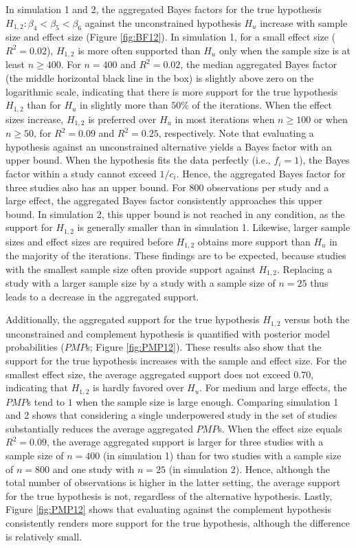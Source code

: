 \documentclass[review, 3p, authoryear]{elsarticle} %
\begin{document}
In simulation 1 and 2, the aggregated Bayes factors for the true hypothesis \(H_{1,2}: \beta_4 < \beta_5 < \beta_6\) against the unconstrained hypothesis \(H_u\) increase with sample size and effect size (Figure \ref{fig:BF12}).
In simulation 1, for a small effect size (\(R^2 = 0.02\)), \(H_{1,2}\) is more often supported than \(H_u\) only when the sample size is at least \(n \geq 400\).
For \(n = 400\) and \(R^2 = 0.02\), the median aggregated Bayes factor (the middle horizontal black line in the box) is slightly above zero on the logarithmic scale, indicating that there is more support for the true hypothesis \(H_{1,2}\) than for \(H_u\) in slightly more than \(50\%\) of the iterations.
When the effect sizes increase, \(H_{1,2}\) is preferred over \(H_u\) in most iterations when \(n \geq 100\) or when \(n \geq 50\), for \(R^2 = 0.09\) and \(R^2 = 0.25\), respectively.
Note that evaluating a hypothesis against an unconstrained alternative yields a Bayes factor with an upper bound.
When the hypothesis fits the data perfectly (i.e., \(f_i = 1\)), the Bayes factor within a study cannot exceed \(1/c_i\).
Hence, the aggregated Bayes factor for three studies also has an upper bound.
For \(800\) observations per study and a large effect, the aggregated Bayes factor consistently approaches this upper bound.
In simulation 2, this upper bound is not reached in any condition, as the support for \(H_{1,2}\) is generally smaller than in simulation 1.
Likewise, larger sample sizes and effect sizes are required before \(H_{1,2}\) obtains more support than \(H_u\) in the majority of the iterations.
These findings are to be expected, because studies with the smallest sample size often provide support against \(H_{1,2}\).
Replacing a study with a larger sample size by a study with a sample size of \(n = 25\) thus leads to a decrease in the aggregated support.

Additionally, the aggregated support for the true hypothesis \(H_{1,2}\) versus both the unconstrained and complement hypothesis is quantified with posterior model probabilities (\(PMP\)s; Figure \ref{fig:PMP12}).
These results also show that the support for the true hypothesis increases with the sample and effect size.
For the smallest effect size, the average aggregated support does not exceed \(0.70\), indicating that \(H_{1,2}\) is hardly favored over \(H_u\).
For medium and large effects, the \(PMP\)s tend to \(1\) when the sample size is large enough.
Comparing simulation 1 and 2 shows that considering a single underpowered study in the set of studies substantially reduces the average aggregated \(PMP\)s.
When the effect size equals \(R^2 = 0.09\), the average aggregated support is larger for three studies with a sample size of \(n = 400\) (in simulation 1) than for two studies with a sample size of \(n = 800\) and one study with \(n = 25\) (in simulation 2).
Hence, although the total number of observations is higher in the latter setting, the average support for the true hypothesis is not, regardless of the alternative hypothesis.
Lastly, Figure \ref{fig:PMP12} shows that evaluating against the complement hypothesis consistently renders more support for the true hypothesis, although the difference is relatively small.
\end{document}
